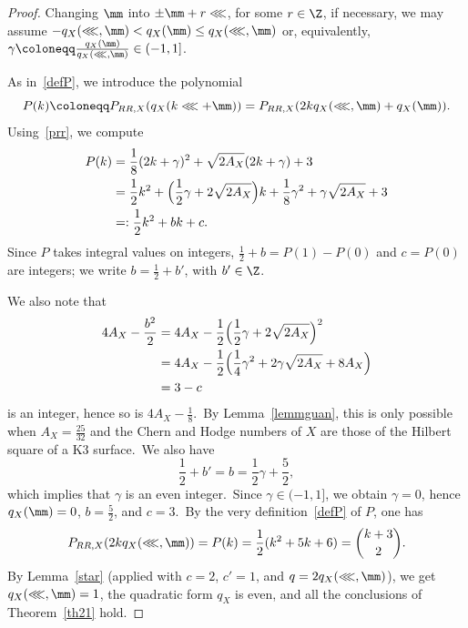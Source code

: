 \begin{proof}
Changing   $\mm$ into $\pm\mm+r\lll$, for some $r\in\Z$, if necessary, we may assume $-q_X(\lll,\mm)< q_X(\mm)\le q_X(\lll,\mm)$ or, equivalently, $\gamma\coloneqq \frac{q_X(\mm)}{q_X(\lll,\mm)}\in (-1,1] $.\

As in~\eqref{defP}, we introduce the polynomial
$$P(k)\coloneqq P_{RR,X}(q_X(k\lll+ \mm))=P_{RR,X}(2kq_X(\lll,\mm)+q_X(\mm)).$$
Using~\eqref{prr}, we compute
\begin{align*}
 P(k)&= \frac{1}{8}(2k+\gamma)^2+ \sqrt{2A_X}(2k+\gamma) +3  \\
 &=\frac{1}{2}k^2+\Bigl( \frac{1}{2}\gamma+2\sqrt{2A_X} \Bigr)k+\frac{1}{8}\gamma^2+ \gamma\sqrt{2A_X}+3\\
 &=:\frac{1}{2}k^2 +  b  k +c.
\end{align*}
Since $P$ takes integral values on integers, $\frac{1}2+b=P(1)-P(0)$ and $c=P(0)$ are integers; we write $b=\frac12+b'$, with $b'\in\Z$.

We also note that
\begin{align*}
    4A_X-\frac{b^2}{2}&= 4A_X-\frac{1}{2}\Bigl( \frac{1}{2}\gamma+2\sqrt{2A_X} \Bigr)^2\nonumber\\
    &=4A_X-\frac{1}{2}\Bigl( \frac{1}{4}\gamma^2+2\gamma\sqrt{2A_X}+8A_X \Bigr)\\
    &=3-c\nonumber
\end{align*}
is an integer, hence so is $4A_X-\frac{1}{8}$.\ By Lemma~\ref{lemmguan}, this is only possible when $A_X=\frac{25}{32}$ and the Chern and Hodge numbers of $X$ are those of the Hilbert square of a K3 surface.\ We also have
$$\frac12+b'=b=\frac{1}{2}\gamma+\frac52,$$
which implies that $\gamma$ is an even integer.\ Since $\gamma \in (-1,1] $, we obtain $\gamma=0$,  hence $q_X(\mm)=0$, $b=\frac52$, and $c=3$.\ By  the very definition~\eqref{defP} of $P$, one has
\[
P_{RR,X}(2kq_X(\lll,\mm))=P(k)= \frac{1}{2}(k^2 +  5  k +6)=\binom{k+3}{2}.
\]
By Lemma~\ref{star} (applied with $c=2$, $c'=1$, and $q=2q_X(\lll,\mm)$), we get $q_X(\lll,\mm)=1$, the quadratic form $q_X$ is even, and all the conclusions of Theorem~\ref{th21} hold.
\end{proof}


